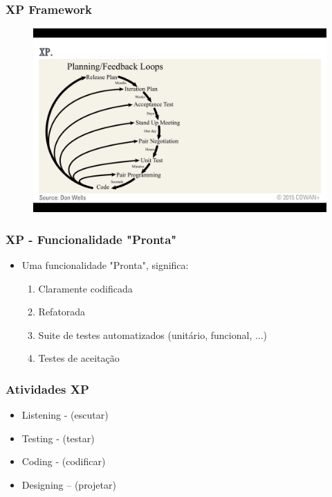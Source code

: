 \begin{frame}	
 \frametitle{XP Framework}
  \begin{figure}
   \centering
   \includegraphics[width = \textwidth]{figs/xp_g.png}
  \end{figure}
\end{frame}

\begin{frame}
 \frametitle{XP - Funcionalidade "Pronta"}
 \begin{itemize}
  \item Uma funcionalidade "Pronta", significa:
  \begin{enumerate}
   \item Claramente codificada
   \item Refatorada
   \item Suite de testes automatizados (unitário, funcional, ...)
   \item Testes de aceitação
  \end{enumerate}
 \end{itemize}
\end{frame} 

\begin{frame}
 \frametitle{Atividades XP}
 \begin{itemize}
  \item  Listening - (escutar)
  \item  Testing - (testar)
  \item Coding - (codificar)
  \item Designing – (projetar)
 \end{itemize}
\end{frame}


